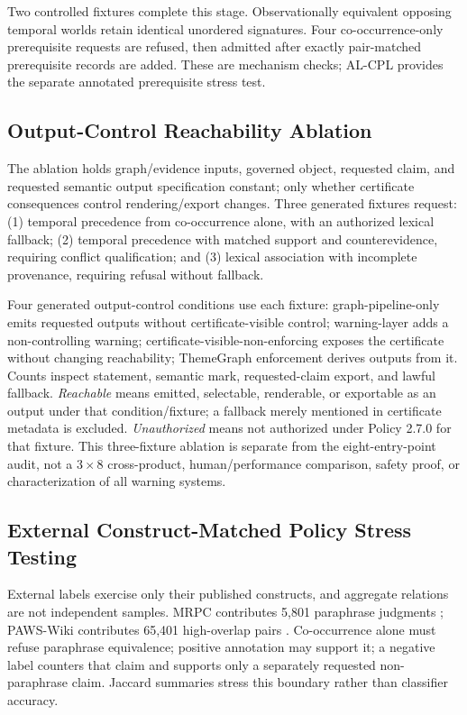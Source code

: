 \documentclass[manuscript,screen,review,anonymous]{acmart}
\begin{document}
Two controlled fixtures complete this stage. Observationally equivalent opposing temporal worlds retain identical unordered signatures. Four co-occurrence-only prerequisite requests are refused, then admitted after exactly pair-matched prerequisite records are added. These are mechanism checks; AL-CPL provides the separate annotated prerequisite stress test.

\subsection{Output-Control Reachability Ablation}

The ablation holds graph/evidence inputs, governed object, requested claim, and requested semantic output specification constant; only whether certificate consequences control rendering/export changes. Three generated fixtures request: (1) temporal precedence from co-occurrence alone, with an authorized lexical fallback; (2) temporal precedence with matched support and counterevidence, requiring conflict qualification; and (3) lexical association with incomplete provenance, requiring refusal without fallback.

Four generated output-control conditions use each fixture: graph-pipeline-only emits requested outputs without certificate-visible control; warning-layer adds a non-controlling warning; certificate-visible-non-enforcing exposes the certificate without changing reachability; ThemeGraph enforcement derives outputs from it. Counts inspect statement, semantic mark, requested-claim export, and lawful fallback. \emph{Reachable} means emitted, selectable, renderable, or exportable as an output under that condition/fixture; a fallback merely mentioned in certificate metadata is excluded. \emph{Unauthorized} means not authorized under Policy 2.7.0 for that fixture. This three-fixture ablation is separate from the eight-entry-point audit, not a $3\times8$ cross-product, human/performance comparison, safety proof, or characterization of all warning systems.

\subsection{External Construct-Matched Policy Stress Testing}

External labels exercise only their published constructs, and aggregate relations are not independent samples. MRPC contributes 5,801 paraphrase judgments \cite{dolan2005}; PAWS-Wiki contributes 65,401 high-overlap pairs \cite{zhang2019}. Co-occurrence alone must refuse paraphrase equivalence; positive annotation may support it; a negative label counters that claim and supports only a separately requested non-paraphrase claim. Jaccard summaries stress this boundary rather than classifier accuracy.
\end{document}
